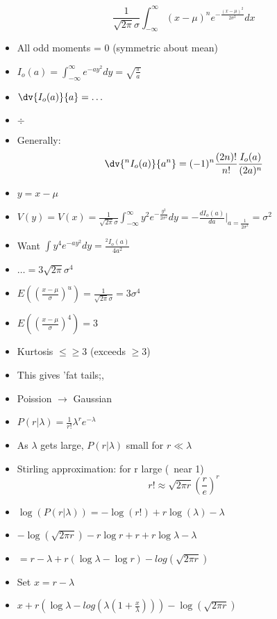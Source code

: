 \begin{itemize}
          \[ \frac{1}{\sqrt{2 \pi} \sigma} \int_{-\infty}^{\infty} (x - \mu)^n e^{-\frac{(x - \mu)^2}{2 \sigma^2}} dx \]
    \item All odd moments = 0 (symmetric about mean)
    \item $I_o(a) = \int_{-\infty}^{\infty} e^{-ay^2} dy = \sqrt{\frac{\pi}{a}}$
    \item $\dv{I_o(a)}{a} = \ldots $
    \item $\div$
    \item Generally:
          \[ \dv{^n I_o(a)}{a^n} = (-1)^n \frac{(2n)!}{n!} \frac{I_o(a)}{(2a)^n} \]
    \item $y = x -\mu $
    \item $V(y) = V(x) = \frac{1}{\sqrt{2 \pi} \sigma} \int_{-\infty}^{\infty} y^2 e^{-\frac{y^2}{2 \sigma^2}} dy = -\frac{d I_o(a)}{da} |_{a = \frac{1}{2 \sigma^2}} = \sigma^2$
    \item Want $\int y^4 e^{-ay^2} dy = \frac{^2 I_o(a)}{4 a^2}$
    \item $\ldots = 3 \sqrt{2 \pi} \sigma^4$
    \item $E((\frac{x-\mu}{\sigma})^u) = \frac{1}{\sqrt{2 \pi}\sigma} = 3 \sigma^4$
    \item $E((\frac{x-\mu}{\sigma})^4) = 3$
    \item Kurtosis $\leq \geq 3 $ (exceeds $ \geq 3$)
    \item This gives 'fat tails;,
    \item Poission $\rightarrow$ Gaussian
    \item $P(r|\lambda) = \frac{1}{r!} \lambda^r e^{-\lambda}$
    \item As $\lambda$ gets large, $P(r|\lambda)$ small for $r \ll \lambda$
    \item Stirling approximation: for r large (~near 1)
          \[ r! \approx \sqrt{2 \pi r} (\frac{r}{e})^r \]
    \item $\log(P(r|\lambda)) = -\log(r!) + r \log(\lambda) - \lambda$
    \item $-\log(\sqrt{2 \pi r}) -r \log r + r + r \log \lambda - \lambda$
    \item $= r - \lambda + r (\log \lambda - \log r) -log(\sqrt{2 \pi r})$
    \item Set $x = r - \lambda$
    \item $x + r(\log \lambda - log (\lambda ( 1+ \frac{x}{\lambda}))) - \log(\sqrt{2 \pi r})$

\end{itemize}
